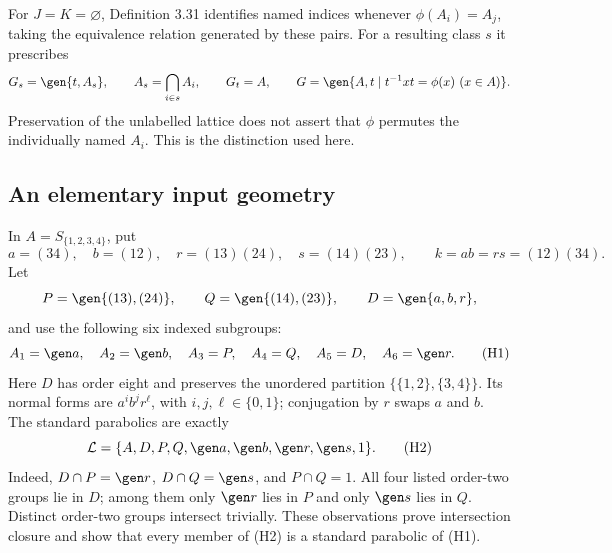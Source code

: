 For $J=K=\varnothing$, Definition 3.31 identifies named indices whenever
$\phi(A_i)=A_j$, taking the equivalence relation generated by these pairs.
For a resulting class $s$ it prescribes
\[
 G_s=\gen{t,A_s},\qquad A_s=\bigcap_{i\in s}A_i,
 \qquad G_t=A,
 \qquad G=\gen{A,t\mid t^{-1}xt=\phi(x)\ (x\in A)}.
\]
Preservation of the unlabelled lattice does not assert that $\phi$ permutes
the individually named $A_i$. This is the distinction used here.

\subsection{An elementary input geometry}
In $A=S_{\{1,2,3,4\}}$, put
\[
 a=(34),\quad b=(12),\quad r=(13)(24),\quad s=(14)(23),
 \qquad k=ab=rs=(12)(34).
\]
Let
\[
 P=\gen{(13),(24)},\qquad Q=\gen{(14),(23)},\qquad
 D=\gen{a,b,r},
\]
and use the following six indexed subgroups:
\[
 A_1=\gen a,\quad A_2=\gen b,\quad A_3=P,\quad
 A_4=Q,\quad A_5=D,\quad A_6=\gen r.                 \tag{H1}
\]
Here $D$ has order eight and preserves the unordered partition
$\{\{1,2\},\{3,4\}\}$. Its normal forms are $a^i b^j r^\ell$, with
$i,j,\ell\in\{0,1\}$; conjugation by $r$ swaps $a$ and $b$.
The standard parabolics are exactly
\[
 \mathcal L=\{A,D,P,Q,\gen a,\gen b,\gen r,\gen s,1\}.       \tag{H2}
\]
Indeed, $D\cap P=\gen r$, $D\cap Q=\gen s$, and $P\cap Q=1$.
All four listed order-two groups lie in $D$; among them only $\gen r$
lies in $P$ and only $\gen s$ lies in $Q$. Distinct order-two groups
intersect trivially. These observations prove intersection closure and
show that every member of (H2) is a standard parabolic of (H1).

